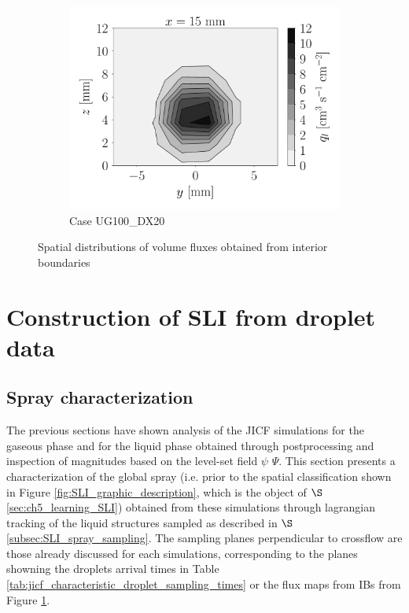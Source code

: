 \begin{figure}[ht]
\begin{subfigure}[b]{1.1\textwidth}
   \includegraphics[scale=0.225]{./part2_developments/figures_ch5_resolved_JICF/flow_rates_ibs/spatial_maps/UG100_DX20_x15mm_volume_flux}
   \vspace*{-0.1in}
	\caption{Case UG100\_DX20}
\end{subfigure}


   \caption{Spatial distributions of volume fluxes obtained from interior boundaries}
\label{fig:ibs_spatial_distributions}
\end{figure}

\clearpage

\section{Construction of SLI from droplet data}

\subsection{Spray characterization}
\label{subsec:ch5_sec_spray_characterization}


The previous sections have shown analysis of the JICF simulations for the gaseous phase and for the liquid phase obtained through postprocessing and inspection of magnitudes based on the level-set field $\psi$ $\Psi$. This section presents a characterization of the global spray (i.e. prior to the spatial classification shown in Figure \ref{fig:SLI_graphic_description}, which is the object of $\S$\ref{sec:ch5_learning_SLI}) obtained from these simulations through lagrangian tracking of the liquid structures sampled as described in $\S$\ref{subsec:SLI_spray_sampling}. The sampling planes perpendicular to crossflow are those already discussed for each simulations, corresponding to the planes showning the droplets arrival times in Table \ref{tab:jicf_characteristic_droplet_sampling_times} or the flux maps from IBs from Figure \ref{fig:ibs_spatial_distributions}.

